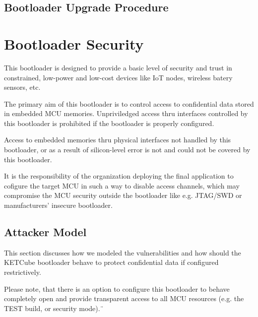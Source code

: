 
\subsection{Bootloader Upgrade Procedure}


\clearpage
\section{Bootloader Security} \label{sec:security}

This bootloader is designed to provide a basic level of security and trust in constrained,
low-power and low-cost devices like IoT nodes, wireless batery sensors, etc.

The primary aim of this bootloader is to control access to confidential data stored in embedded MCU memories.
Unpriviledged access thru interfaces controlled by this bootloader is prohibited if the bootloader is properly configured.

Access to embedded memories thru physical interfaces not handled by this bootloader, 
or as a result of silicon-level error is not and could not be covered by this bootloader.

It is the responsibility of the organization deploying the final application to cofigure the target MCU
in such a way to disable access channels, which may compromise the MCU security outside the bootloader like
e.g. JTAG/SWD or manufacturers' insecure bootloader.

\subsection{Attacker Model} \label{sec:security:model}

This section discusses how we modeled the vulnerabilities and how should the KETCube bootloader behave to protect confidential data if configured restrictively.

Please note, that there is an option to configure this bootloader to behave completely open and provide transparent access to all MCU resources (e.g. the TEST build, or  security mode).¨


